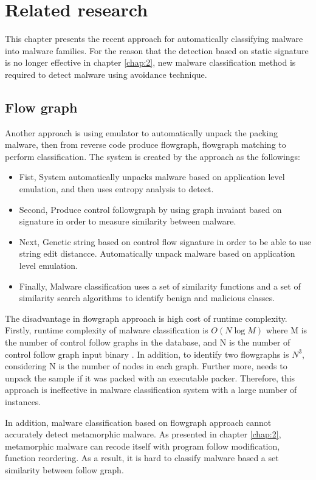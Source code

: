 \chapter{Related research}\label{chap:3}
%
%
This chapter presents the recent approach for automatically classifying malware into malware families. For the reason that the detection based on static signature is no longer effective in chapter \ref{chap:2}, new malware classification method is required to detect malware using avoidance technique.

\section{Flow graph}
Another approach is using emulator to automatically unpack the packing malware, then from reverse code produce flowgraph, flowgraph matching to perform classification\cite{silvio}. The system is created by the approach as the followings:

\begin{itemize}
\item Fist, System automatically unpacks malware based on application level emulation, and then uses entropy analysis to detect.
\item Second, Produce control followgraph by using graph invaiant based on signature in order to measure similarity between malware.
\item Next, Genetic string based on control flow signature in order to be able to use string edit distancce. Automatically unpack malware based on application level emulation.
\item Finally, Malware classification uses a set of  similarity functions and a set of similarity search algorithms to identify benign and malicious classes.
\end{itemize}

The disadvantage in flowgraph approach is high cost of runtime complexity. Firstly, runtime complexity of malware classification is $O(N\log{M})$ where M is the number of control follow graphs in the database, and N is the number of control follow graph input binary \cite{silvio}. In addition, to identify two flowgraphs is $N^{3}$, considering N is the number of nodes in each graph. Further more, needs to unpack the sample if it was packed with an executable packer. Therefore, this approach is ineffective in malware classification system with a large number of instances.

In addition, malware classification based on flowgraph approach cannot accurately detect metamorphic malware. As presented in chapter \ref{chap:2}, metamorphic malware can recode itself with program follow modification, function reordering. As a result, it is hard to classify malware based a set  similarity between follow graph.
